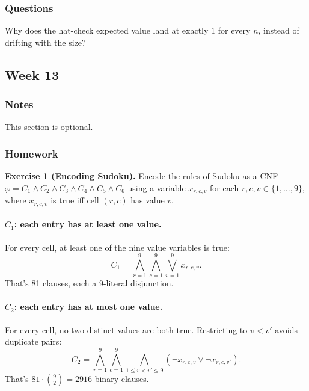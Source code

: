\documentclass{article}
\theoremstyle{theorem}
\theoremstyle{definition}
\theoremstyle{remark}
\begin{document}
\subsubsection{Questions}

Why does the hat-check expected value land at exactly $1$ for every $n$, instead of drifting with the size?




































\subsection{Week 13}

\subsubsection{Notes}

This section is optional.

\subsubsection{Homework}

\textbf{Exercise 1 (Encoding Sudoku).}
Encode the rules of Sudoku as a CNF $\varphi = C_1 \land C_2 \land C_3 \land C_4 \land C_5 \land C_6$ using a variable $x_{r,c,v}$ for each $r, c, v \in \{1, \ldots, 9\}$, where $x_{r,c,v}$ is true iff cell $(r, c)$ has value $v$.

\paragraph{$C_1$: each entry has at least one value.}
For every cell, at least one of the nine value variables is true:
\[
  C_1 = \bigwedge_{r=1}^{9} \bigwedge_{c=1}^{9} \bigvee_{v=1}^{9} x_{r,c,v}.
\]
That's 81 clauses, each a 9-literal disjunction.

\paragraph{$C_2$: each entry has at most one value.}
For every cell, no two distinct values are both true. Restricting to $v < v'$ avoids duplicate pairs:
\[
  C_2 = \bigwedge_{r=1}^{9} \bigwedge_{c=1}^{9} \bigwedge_{1 \le v < v' \le 9} (\lnot x_{r,c,v} \lor \lnot x_{r,c,v'}).
\]
That's $81 \cdot \binom{9}{2} = 2916$ binary clauses.
\end{document}
